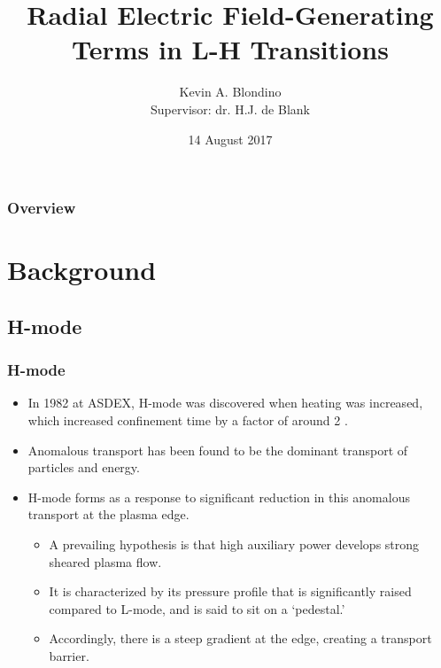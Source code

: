 \documentclass{beamer}
\title[$E_r$-Generating Terms in L-H Transitions]{Radial Electric Field-Generating Terms in L-H Transitions}
\author{Kevin A. Blondino \\
	Supervisor: dr. H.J. de Blank}
\institute[TUe]{Eindhoven University of Technology \\
	\medskip
	\textit{k.blondino@student.tue.nl}}
\date{14 August 2017}
\begin{document}
\begin{frame}
\titlepage
\end{frame}

\begin{frame}
\frametitle{Overview}
\tableofcontents
\end{frame}


\section{Background}
\subsection{H-mode}
\begin{frame}
\frametitle{H-mode}
	\begin{itemize}
		\item In 1982 at ASDEX, H-mode was discovered when heating was increased, which increased confinement time by a factor of around 2 \cite{wagner_development_1984}.
		\item Anomalous transport has been found to be the dominant transport of particles and energy.
		\item H-mode forms as a response to significant reduction in this anomalous transport at the plasma edge.
		\begin{itemize}
			\item A prevailing hypothesis is that high auxiliary power develops strong sheared plasma flow.
			\item It is characterized by its pressure profile that is significantly raised compared to L-mode, and is said to sit on a `pedestal.'
			\item Accordingly, there is a steep gradient at the edge, creating a transport barrier.
		\end{itemize}
	\end{itemize}
\end{frame}
\end{document}
